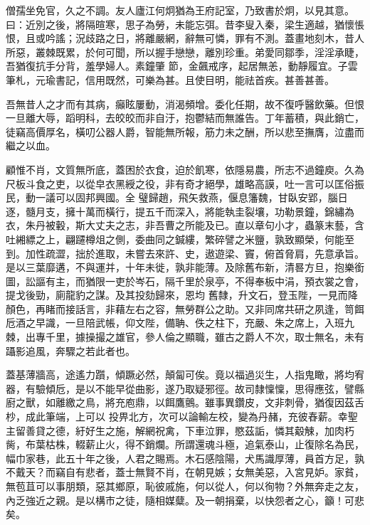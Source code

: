 \begin{pinyinscope}
 僧孺坐免官，久之不調。友人廬江何炯猶為王府記室，乃致書於炯，以見其意。曰：近別之後，將隔暄寒，思子為勞，未能忘弭。昔李叟入秦，梁生適越，猶懷悵恨，且或吟謠；況歧路之日，將離嚴網，辭無可憐，罪有不測。蓋畫地刻木，昔人所惡，叢棘既累，於何可聞，所以握手戀戀，離別珍重。弟愛同鄒季，淫淫承睫，吾猶復抗手分背，羞學婦人。素鐘肇
 節，金飆戒序，起居無恙，動靜履宜。子雲筆札，元瑜書記，信用既然，可樂為甚。且使目明，能祛首疾。甚善甚善。



 吾無昔人之才而有其病，癲眩屢動，消渴頻增。委化任期，故不復呼醫飲藥。但恨一旦離大辱，蹈明科，去皎皎而非自汙，抱鬱結而無誰告。丁年蓄積，與此銷亡，徒竊高價厚名，橫叨公器人爵，智能無所報，筋力未之酬，所以悲至撫膺，泣盡而繼之以血。



 顧惟不肖，文質無所底，蓋困於衣食，迫於飢寒，依隱易農，所志不過鐘庾。久為尺板斗食之吏，以從皁衣黑綬之役，非有奇才絕學，雄略高謨，吐一言可以匡俗振民，動一議可以固邦興國。全
 璧歸趙，飛矢救燕，偃息籓魏，甘臥安郢，腦日逐，髓月支，擁十萬而橫行，提五千而深入，將能執圭裂壤，功勒景鐘，錦繡為衣，朱丹被轂，斯大丈夫之志，非吾曹之所能及已。直以章句小才，蟲篆末藝，含吐緗縹之上，翩躚樽俎之側，委曲同之鍼縷，繁碎譬之米鹽，孰致顯榮，何能至到。加性疏澀，拙於進取，未嘗去來許、史，遨遊梁、竇，俯首脅肩，先意承旨。是以三葉靡遘，不與運并，十年未徙，孰非能薄。及除舊布新，清晷方旦，抱樂銜圖，訟謳有主，而猶限一吏於岑石，隔千里於泉亭，不得奉板中涓，預衣裳之會，提戈後勁，廁龍豹之謀。及其投劾歸來，恩均
 舊隸，升文石，登玉陛，一見而降顏色，再睹而接話言，非藉左右之容，無勞群公之助。又非同席共研之夙逢，笥餌卮酒之早識，一旦陪武帳，仰文陛，備聃、佚之柱下，充嚴、朱之席上，入班九棘，出專千里，據操撮之雄官，參人倫之顯職，雖古之爵人不次，取士無名，未有躡影追風，奔驟之若此者也。



 蓋基薄牆高，途遙力躓，傾蹶必然，顛匐可俟。竟以福過災生，人指鬼瞰，將均宥器，有驗傾卮，是以不能早從曲影，遂乃取疑邪徑。故司隸懍懍，思得應弦，譬縣廚之獸，如離繳之鳥，將充庖鼎，以餌鷹鸇。雖事異鑽皮，文非刺骨，猶復因茲舌杪，成此筆端，上可以
 投畀北方，次可以論輸左校，變為丹赭，充彼舂薪。幸聖主留善貸之德，紆好生之施，解網祝禽，下車泣罪，愍茲詬，憐其觳觫，加肉朽胔，布葉枯株，輟薪止火，得不銷爛。所謂還魂斗極，追氣泰山，止復除名為民，幅巾家巷，此五十年之後，人君之賜焉。木石感陰陽，犬馬識厚薄，員首方足，孰不戴天？而竊自有悲者，蓋士無賢不肖，在朝見嫉；女無美惡，入宮見妒。家貧，無苞苴可以事朋類，惡其鄉原，恥彼戚施，何以從人，何以徇物？外無奔走之友，內乏強近之親。是以構市之徒，隨相媒糵。及一朝捐棄，以快怨者之心，籲！可悲矣。




\end{pinyinscope}
